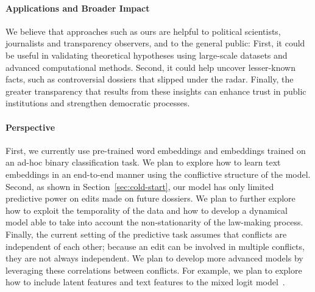 \paragraph{Applications and Broader Impact}
We believe that approaches such as ours are helpful to political scientists, journalists and transparency observers, and to the general public:
First, it could be useful in validating theoretical hypotheses using large-scale datasets and advanced computational methods.
Second, it could help uncover lesser-known facts, such as controversial dossiers that slipped under the radar.
Finally, the greater transparency that results from these insights can enhance trust in public institutions and strengthen democratic processes.


\paragraph{Perspective}
First, we currently use pre-trained word embeddings and embeddings trained on an ad-hoc binary classification task.
We plan to explore how to learn text embeddings in an end-to-end manner using the conflictive structure of the \warofwords{} model.
Second, as shown in Section~\ref{sec:cold-start}, our model has only limited predictive power on edits made on future dossiers.
We plan to further explore how to exploit the temporality of the data and how to develop a dynamical model able to take into account the non-stationarity of the law-making process.
Finally, the current setting of the predictive task assumes that conflicts are independent of each other; because an edit can be involved in multiple conflicts, they are not always independent.
We plan to develop more advanced models by leveraging these correlations between conflicts.
For example, we plan to explore how to include latent features and text features to the mixed logit model~\citep{hensher2003mixed}.
